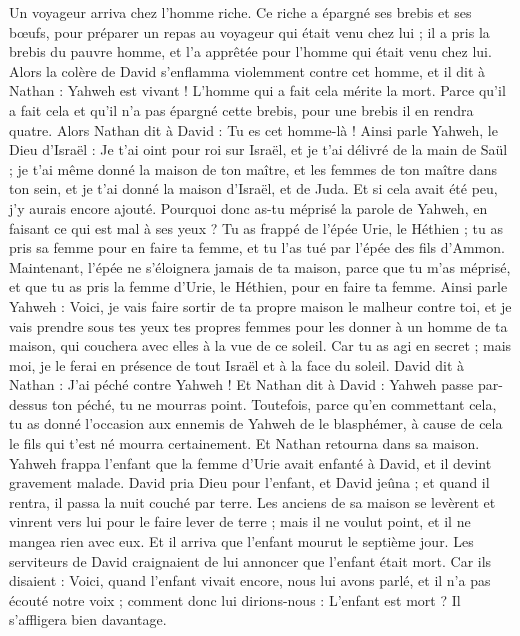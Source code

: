 \begin{multicols}{2}
Un voyageur arriva chez l'homme riche. Ce riche a épargné ses brebis et ses bœufs, pour préparer un repas au voyageur qui était venu chez lui ; il a pris la brebis du pauvre homme, et l'a apprêtée pour l'homme qui était venu chez lui.
Alors la colère de David s'enflamma violemment contre cet homme, et il dit à Nathan : Yahweh est vivant ! L'homme qui a fait cela mérite la mort.
Parce qu'il a fait cela et qu'il n'a pas épargné cette brebis, pour une brebis il en rendra quatre.
Alors Nathan dit à David : Tu es cet homme-là ! Ainsi parle Yahweh, le Dieu d'Israël : Je t'ai oint pour roi sur Israël, et je t'ai délivré de la main de Saül ;
je t'ai même donné la maison de ton maître, et les femmes de ton maître dans ton sein, et je t'ai donné la maison d'Israël, et de Juda. Et si cela avait été peu, j'y aurais encore ajouté.
Pourquoi donc as-tu méprisé la parole de Yahweh, en faisant ce qui est mal à ses yeux ? Tu as frappé de l'épée Urie, le Héthien ; tu as pris sa femme pour en faire ta femme, et tu l'as tué par l'épée des fils d'Ammon.
Maintenant, l'épée ne s'éloignera jamais de ta maison, parce que tu m'as méprisé, et que tu as pris la femme d'Urie, le Héthien, pour en faire ta femme.
Ainsi parle Yahweh : Voici, je vais faire sortir de ta propre maison le malheur contre toi, et je vais prendre sous tes yeux tes propres femmes pour les donner à un homme de ta maison, qui couchera avec elles à la vue de ce soleil.
Car tu as agi en secret ; mais moi, je le ferai en présence de tout Israël et à la face du soleil.
David dit à Nathan : J'ai péché contre Yahweh ! Et Nathan dit à David : Yahweh passe par-dessus ton péché, tu ne mourras point.
Toutefois, parce qu'en commettant cela, tu as donné l'occasion aux ennemis de Yahweh de le blasphémer, à cause de cela le fils qui t'est né mourra certainement.
Et Nathan retourna dans sa maison. Yahweh frappa l'enfant que la femme d'Urie avait enfanté à David, et il devint gravement malade.
David pria Dieu pour l'enfant, et David jeûna ; et quand il rentra, il passa la nuit couché par terre.
Les anciens de sa maison se levèrent et vinrent vers lui pour le faire lever de terre ; mais il ne voulut point, et il ne mangea rien avec eux.
Et il arriva que l'enfant mourut le septième jour. Les serviteurs de David craignaient de lui annoncer que l'enfant était mort. Car ils disaient : Voici, quand l'enfant vivait encore, nous lui avons parlé, et il n'a pas écouté notre voix ; comment donc lui dirions-nous : L'enfant est mort ? Il s'affligera bien davantage.

\end{multicols}
